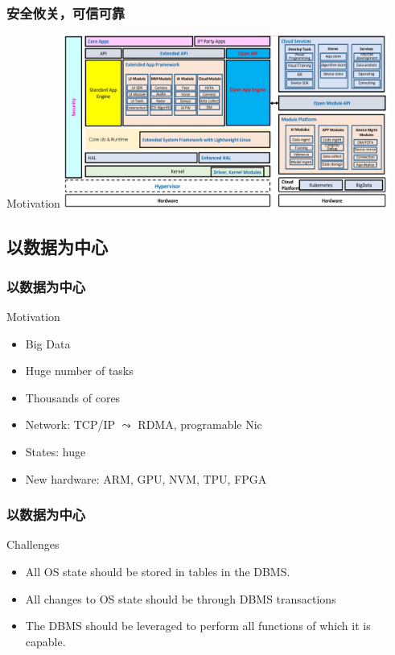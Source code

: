\begin{frame}
\frametitle{安全攸关，可信可靠}
\begin{block}{Motivation}
\centering
\includegraphics[width=0.8\textwidth]{fig23/os-security.jpg}
\end{block}
\end{frame}


\subsection{以数据为中心}
\begin{frame}
\frametitle{以数据为中心}
\begin{block}{Motivation}
\begin{itemize}
	\item Big Data
	\item Huge number of tasks
	\item Thousands of cores
	\item Network: TCP/IP $\leadsto$ RDMA, programable Nic
	\item States: huge
	\item New hardware: ARM, GPU, NVM, TPU, FPGA
\end{itemize} 
\end{block}
\end{frame}

\begin{frame}
\frametitle{以数据为中心}
\begin{block}{Challenges}
\begin{itemize}
	\item All OS state should be stored in tables in the DBMS.
	\item All changes to OS state should be through DBMS transactions
	\item The DBMS should be leveraged to perform all functions of which it is capable.
\end{itemize} 
\end{block}
\end{frame}


